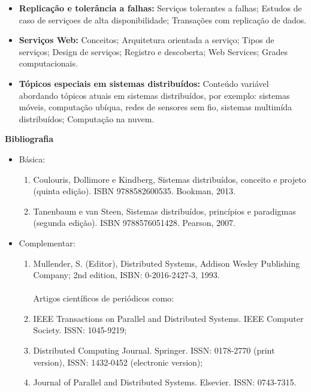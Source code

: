 \begin{itemize}
\item \textbf{Replicação e tolerância a falhas:} Servi\c{c}os tolerantes a falhas; Estudos de caso de servi\c{c}oes de alta disponibilidade; Transa\c{c}\~oes com replica\c{c}\~ao de dados.

\item \textbf{Serviços Web:} Conceitos; Arquitetura orientada a servi\c{c}o; Tipos de servi\c{c}os; Design de servi\c{c}os; Registro e descoberta; Web Services; Grades computacionais.

\item \textbf{T\'opicos especiais em sistemas distribu\'idos:} Conte\'udo vari\'avel abordando t\'opicos atuais em sistemas distribu\'idos, por exemplo: sistemas m\'oveis, computa\c{c}\~ao ub\'iqua, redes de sensores sem fio, sistemas multim\'ida distribu\'idos; Computa\c{c}\~ao na nuvem.

\end{itemize}


%
%
%


\begin{snugshade}\begin{center}\textbf{
    Bibliografia
}\end{center}\end{snugshade}

\begin{itemize} 
  \item Básica:
	\begin{enumerate}
		\item Coulouris, Dollimore e Kindberg, Sistemas distribuídos, conceito e projeto (quinta edição). ISBN 9788582600535. Bookman, 2013.
		\item Tanenbaum e van Steen, Sistemas distribuídos, princípios e paradigmas (segunda edição). ISBN 9788576051428. Pearson, 2007.
	\end{enumerate}
  \item Complementar:
	\begin{enumerate} 
		\item Mullender, S. (Editor), Distributed Systems, Addison Wesley Publishing Company; 2nd edition, ISBN: 0-2016-2427-3, 1993.\\
        \\
	Artigos cient\'ificos de peri\'odicos como: 
		\item IEEE Transactions on Parallel and Distributed Systems. IEEE Computer Society. ISSN: 1045-9219;
		\item Distributed Computing Journal. Springer. ISSN: 0178-2770 (print version), ISSN: 1432-0452 (electronic version);
		\item Journal of Parallel and Distributed Systems. Elsevier. ISSN: 0743-7315.
	\end{enumerate}
\end{itemize}
